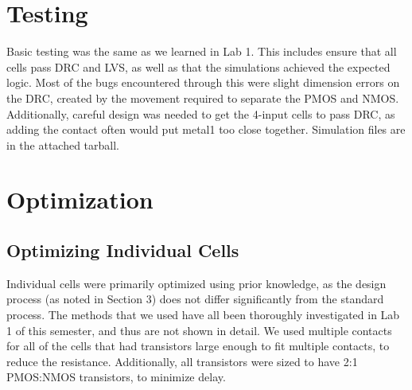 \documentclass{article}
\begin{document}
\section{Testing}\label{sec:testing}
Basic testing was the same as we learned in Lab 1. This includes ensure that all cells pass DRC and LVS, as well as that the simulations achieved the expected logic. Most of the bugs encountered through this were slight dimension errors on the DRC, created by the movement required to separate the PMOS and NMOS. Additionally, careful design was needed to get the 4-input cells to pass DRC, as adding the contact often would put metal1 too close together. Simulation files are in the attached tarball.

\section{Optimization}
\subsection{Optimizing Individual Cells}
Individual cells were primarily optimized using prior knowledge, as the design process (as noted in Section 3) does not differ significantly from the standard process. The methods that we used have all been thoroughly investigated in Lab 1 of this semester, and thus are not shown in detail. We used multiple contacts for all of the cells that had transistors large enough to fit multiple contacts, to reduce the resistance. Additionally, all transistors were sized to have 2:1 PMOS:NMOS transistors, to minimize delay. 
\end{document}
